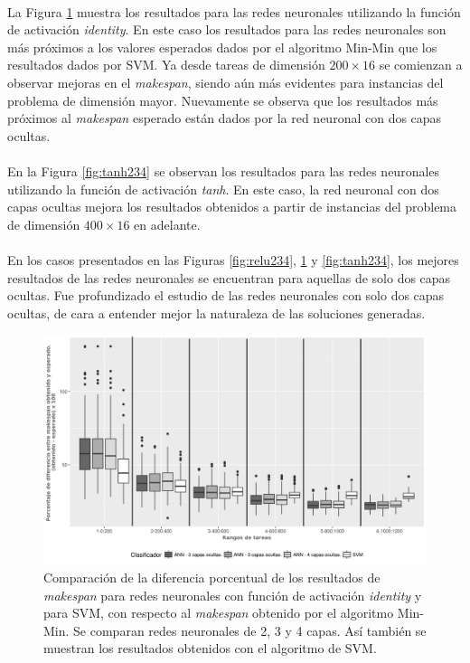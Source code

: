 \paragraph{}La Figura \ref{fig:identity234} muestra los resultados para las redes neuronales utilizando la función de activación \textit{identity}.
En este caso los resultados para las redes neuronales son más próximos a los valores esperados dados por el algoritmo Min-Min que los resultados dados por SVM.
Ya desde tareas de dimensión $ 200 \times 16$ se comienzan a observar mejoras en el \textit{makespan}, siendo aún más evidentes para instancias del problema de dimensión mayor.
Nuevamente se observa que los resultados más próximos al \textit{makespan} esperado están dados por la red neuronal con dos capas ocultas. 

\paragraph{}En la Figura \ref{fig:tanh234} se observan los resultados para las redes neuronales utilizando la función de activación \textit{tanh}.
En este caso, la red neuronal con dos capas ocultas mejora los resultados obtenidos a partir de instancias del problema de dimensión $ 400 \times 16$ en adelante. 

\paragraph{}En los casos presentados en las Figuras \ref{fig:relu234}, \ref{fig:identity234} y \ref{fig:tanh234}, los mejores resultados de las redes neuronales se encuentran para aquellas de solo dos capas ocultas. Fue profundizado el estudio de las redes neuronales con solo dos capas ocultas, de cara a entender mejor la naturaleza de las soluciones generadas. 

\begin{figure}[H]
  \centering
  \includegraphics[width=\columnwidth]{imagenes/comparacion_anns_identity_2.png}
  \caption{Comparación de  la diferencia porcentual  de los resultados de \textit{makespan} para redes neuronales con función de activación \textit{identity} y para SVM, con respecto al \textit{makespan} obtenido por el algoritmo Min-Min.
Se comparan redes neuronales de 2, 3 y 4 capas.
Así también se muestran los resultados obtenidos con el algoritmo de SVM.}
  \label{fig:identity234}
\end{figure}

